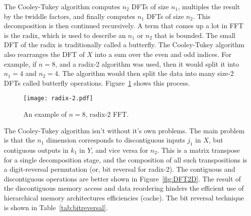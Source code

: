             The Cooley-Tukey algorithm computes $n_2$ DFTs of size $n_1$, multiples the
            result by the twiddle factors, and finally computes $n_1$ DFTs of size
            $n_2$. This decomposition is then continued recursively. A term that comes up a
            lot in FFT is the radix, which is used to describe an $n_1$ or $n_2$ that is
            bounded. The small DFT of the radix is traditionally called a butterfly. The
            Cooley-Tukey algorithm also rearranges the DFT of $X$ into a sum over the even
            and odd indices.
            For example, if $n=8$, and a radix-2 algorithm was used, then it would split it
            into $n_1=4$ and $n_2=4$. The algorithm would then split the data into many
            size-2 DFTs called butterfly operations. Figure~\ref{fig:radix-2} shows this
            process.


            \begin{figure}[htbp!]
                \begin{center}
                    \texttt{[image: radix-2.pdf]}
                \end{center}
                \caption{An example of $n=8$, radix-2 FFT.}
                \label{fig:radix-2}
            \end{figure}

            The Cooley-Tukey algorithm isn't without it's own problems. The main problem is
            that the $n_1$ dimension corresponds to discontiguous inputs $j_1$ in
            $X$, but contiguous outputs in $k_1$ in $Y$, and vice versa for $n_2$.
            This is a matrix transpose for a single decomposition stage, and the
            composition of all such transpositions is a digit-reversal permutation
            (or, bit reversal for radix-2). The contiguous and discontiguous
            operations are better shown in Figure~\ref{fig:DFT2D}. The result of the discontiguous memory
            access and data reordering  hinders the efficient use of hierarchical memory
            architectures efficiencies (cache). The bit reversal technique is shown
            in Table~\ref{tab:bitreversal}.

